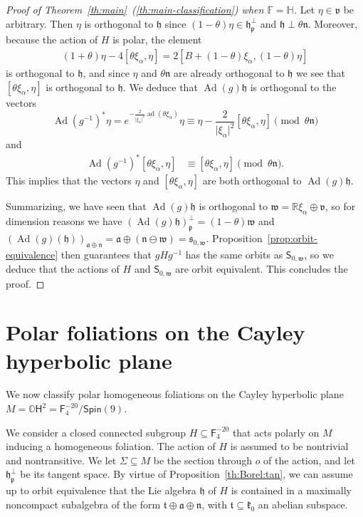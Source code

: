\documentclass[12pt, a4paper]{amsart}
\newcommand{\g}{\mathfrak}
\newcommand{\s}{\mathsf}
\newcommand{\R}{\mathbb{R}}
\renewcommand{\H}{\mathbb{H}}
\renewcommand{\O}{\mathbb{O}}
\newcommand{\F}{\mathbb{F}}
\newcommand{\ad}{\operatorname{ad}}
\newcommand{\Ad}{\operatorname{Ad}}
\theoremstyle{definition}
\begin{document}
\begin{proof}[Proof of Theorem~\textup{\ref{th:main}~(\ref{th:main-classification})} when $\F=\H$]
Let $\eta\in\g{v}$ be arbitrary.
Then $\eta$ is orthogonal to $\g{h}$ since $(1-\theta)\eta\in\g{h}_\g{p}^\perp$ and $\g{h}\perp\theta\g{n}$.
Moreover, because the action of $H$ is polar, the element
\begin{align*}
    (1+\theta)\eta-4[\theta\xi_\alpha,\eta]=2[B+(1-\theta)\xi_\alpha,(1-\theta)\eta]
\end{align*}
is orthogonal to $\g{h}$, and since $\eta$ and $\theta\g{n}$ are already orthogonal
to $\g{h}$ we see that $[\theta\xi_\alpha,\eta]$ is orthogonal
to $\g{h}$.
We deduce that $\Ad(g)\g{h}$ is orthogonal to the vectors
\begin{equation*}
    \Ad(g^{-1})^*\eta
    =
    e^{-\frac{2}{\lvert\xi_\alpha\rvert^2}\ad(\theta\xi_\alpha)}\eta
    \equiv
    \eta-\frac{2}{\lvert\xi_\alpha\rvert^2}[\theta\xi_\alpha,\eta]
    \pmod{\theta\g{n}}
\end{equation*}
and
\begin{align*}
    \Ad(g^{-1})^*[\theta\xi_\alpha,\eta]
    &\equiv
    [\theta\xi_\alpha,\eta]
    \pmod{\theta\g{n}}.
\end{align*}
This implies that the vectors $\eta$ and $[\theta\xi_\alpha,\eta]$ are both orthogonal to $\Ad(g)\g{h}$.

Summarizing, we have seen that $\Ad(g)\g{h}$ is orthogonal to $\g{w}=\R\xi_\alpha\oplus\g{v}$,
so for dimension reasons we have $(\Ad(g)\g{h})_\g{p}^\perp=(1-\theta)\g{w}$ and 
$(\Ad(g)(\g{h}))_{\g{a}\oplus\g{n}}=\g{a}\oplus(\g{n}\ominus \g{w})=\g{s}_{0,\g{w}}$.
Proposition~\ref{prop:orbit-equivalence} then guarantees that $gHg^{-1}$ has the same orbits as
$\s{S}_{0,\g{w}}$, so we deduce that the actions of $H$ and $\s{S}_{0,\g{w}}$ are orbit equivalent.
This concludes the proof.\qedhere
\end{proof}

\section{Polar foliations on the Cayley hyperbolic plane}\label{sec:cayley}

We now classify polar homogeneous foliations on the Cayley hyperbolic plane $M=\O\s{H}^2=\s{F}_4^{-20}/\s{Spin}(9)$.

We consider a closed connected subgroup $H\subseteq \s{F}_4^{-20}$ that acts polarly on $M$ inducing a homogeneous foliation.
The action of $H$ is assumed to be nontrivial and nontransitive.
We let $\Sigma\subseteq M$ be the section through $o$ of the action, and let $\g{h}_{\g{p}}^\perp$ be its tangent space.
By virtue of Proposition~\ref{th:Borel:tan}, we can assume up to orbit equivalence that the Lie algebra $\g{h}$ of $H$ is contained in a maximally noncompact subalgebra of the form $\g{t}\oplus\g{a}\oplus\g{n}$, with $\g{t}\subseteq \g{k}_0$ an abelian subspace.
\end{document}
